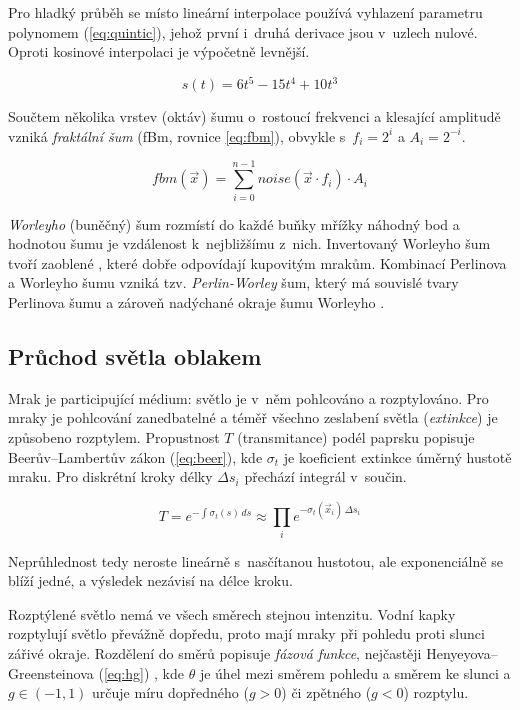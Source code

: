 \documentclass[a4paper, 12pt]{article}
\begin{document}
Pro hladký průběh se místo lineární interpolace používá vyhlazení parametru
polynomem (\ref{eq:quintic}), jehož první i~druhá derivace jsou v~uzlech
nulové. Oproti kosinové interpolaci je výpočetně levnější.

\begin{equation}
  s(t) = 6t^5 - 15t^4 + 10t^3
  \label{eq:quintic}
\end{equation}

Součtem několika vrstev (oktáv) šumu o~rostoucí frekvenci a klesající amplitudě
vzniká \textit{fraktální šum} (fBm, rovnice \ref{eq:fbm}), obvykle
s~$f_i = 2^i$ a $A_i = 2^{-i}$.

\begin{equation}
  fbm(\vec{x}) = \sum^{n-1}_{i=0} noise(\vec{x} \cdot f_i) \cdot A_i
  \label{eq:fbm}
\end{equation}

\textit{Worleyho} (buněčný) šum \cite{worley1996} rozmístí do každé buňky
mřížky náhodný bod a hodnotou šumu je vzdálenost k~nejbližšímu z~nich.
Invertovaný Worleyho šum tvoří zaoblené , které dobře odpovídají
kupovitým mrakům. Kombinací Perlinova a Worleyho šumu vzniká tzv.
\textit{Perlin-Worley} šum, který má souvislé tvary Perlinova šumu a zároveň
nadýchané okraje šumu Worleyho \cite{schneider2015}.

\subsection{Průchod světla oblakem}

Mrak je participující médium: světlo je v~něm pohlcováno a rozptylováno.
Pro mraky je pohlcování zanedbatelné a téměř všechno zeslabení světla
(\textit{extinkce}) je způsobeno rozptylem. Propustnost $T$ (transmitance)
podél paprsku popisuje Beerův--Lambertův zákon (\ref{eq:beer}), kde $\sigma_t$
je koeficient extinkce úměrný hustotě mraku. Pro diskrétní kroky
délky $\Delta s_i$ přechází integrál v~součin.

\begin{equation}
  T = e^{-\int \sigma_t(s)\,ds} \approx \prod_i e^{-\sigma_t(\vec{x}_i)\,\Delta s_i}
  \label{eq:beer}
\end{equation}

Neprůhlednost tedy neroste lineárně s~nasčítanou hustotou, ale exponenciálně
se blíží jedné, a výsledek nezávisí na délce kroku.

Rozptýlené světlo nemá ve všech směrech stejnou intenzitu. Vodní kapky rozptylují
světlo převážně dopředu, proto mají mraky při pohledu proti slunci zářivé okraje.
Rozdělení do směrů popisuje \textit{fázová funkce}, nejčastěji
Henyeyova--Greensteinova (\ref{eq:hg}) \cite{henyey1941}, kde $\theta$ je úhel
mezi směrem pohledu a směrem ke slunci a $g \in (-1, 1)$ určuje míru
dopředného ($g > 0$) či zpětného ($g < 0$) rozptylu.
\end{document}
